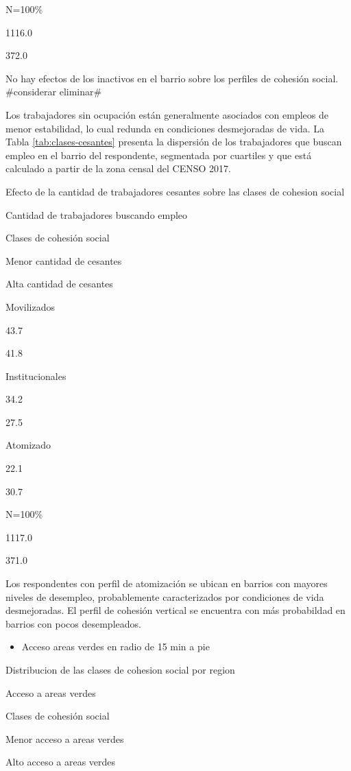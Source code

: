 \documentclass[
  12pt,
]{book}
\providecommand{\tightlist}{%
  \setlength{\itemsep}{0pt}\setlength{\parskip}{0pt}}
\begin{document}
N=100\%

1116.0

372.0

No hay efectos de los inactivos en el barrio sobre los perfiles de cohesión social. \#considerar eliminar\#

Los trabajadores sin ocupación están generalmente asociados con empleos de menor estabilidad, lo cual redunda en condiciones desmejoradas de vida. La Tabla \ref{tab:clases-cesantes} presenta la dispersión de los trabajadores que buscan empleo en el barrio del respondente, segmentada por cuartiles y que está calculado a partir de la zona censal del CENSO 2017.

\label{tab:clases-cesantes}Efecto de la cantidad de trabajadores cesantes sobre las clases de cohesion social

Cantidad de trabajadores buscando empleo

Clases de cohesión social

Menor cantidad de cesantes

Alta cantidad de cesantes

Movilizados

43.7

41.8

Institucionales

34.2

27.5

Atomizado

22.1

30.7

N=100\%

1117.0

371.0

Los respondentes con perfil de atomización se ubican en barrios con mayores niveles de desempleo, probablemente caracterizados por condiciones de vida desmejoradas. El perfil de cohesión vertical se encuentra con más probabildad en barrios con pocos desempleados.

\begin{itemize}
\tightlist
\item
  Acceso areas verdes en radio de 15 min a pie
\end{itemize}

\label{tab:unnamed-chunk-16}Distribucion de las clases de cohesion social por region

Acceso a areas verdes

Clases de cohesión social

Menor acceso a areas verdes

Alto acceso a areas verdes
\end{document}
